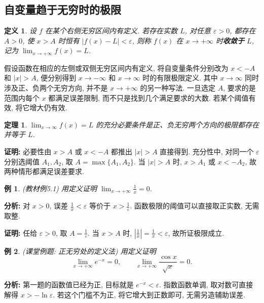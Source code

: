 \documentclass[UTF8,openany]{ctexbook}
\theoremstyle{chinesetextbook}
\newtheorem{definition}{定义}[section]
\newtheorem{example}{例}[section]
\newtheorem{theorem}{定理}[section]
\newenvironment{cnproof}{\par\indent\textbf{证明:} \ignorespaces}{\par}
\begin{document}
\subsection{自变量趋于无穷时的极限}
\begin{definition}
设 $f$ 在某个右侧无穷区间内有定义. 若存在实数 $L$, 对任意 $\varepsilon>0$, 都存在 $A>0$, 使 $x>A$ 时恒有 $|f(x)-L|<\varepsilon$, 则称 $f(x)$ 在 $x\to+\infty$ 时\textbf{收敛于} $L$, 记为 $\displaystyle \lim_{x\to+\infty}f(x)=L$.
\end{definition}
假设函数在相应的左侧或双侧无穷区间内有定义, 将自变量条件分别改为 $x<-A$ 和 $|x|>A$, 便分别得到 $x\to-\infty$ 和 $x\to\infty$ 时的有限极限定义. 其中 $x\to\infty$ 同时涉及正、负两个无穷方向, 并不是 $x\to+\infty$ 的另一种写法. 一旦选定 $A$, 要求的是范围内每个 $x$ 都满足误差限制, 而不只是找到几个满足要求的大数. 若某个阈值有效, 将它增大仍有效.
\begin{theorem}
$\displaystyle \lim_{x\to\infty}f(x)=L$ 的充分必要条件是正、负无穷两个方向的极限都存在并等于 $L$.
\end{theorem}
\begin{cnproof}
必要性由 $x>A$ 或 $x<-A$ 都推出 $|x|>A$ 直接得到. 充分性中, 对同一个 $\varepsilon$ 分别选阈值 $A_1,A_2$, 取 $A=\max\{A_1,A_2\}$. 当 $|x|>A$ 时, $x>A_1$ 或 $x<-A_2$, 故两种情形都满足误差要求.
\end{cnproof}
\begin{example}
(教材例5.1) 用定义证明 $\displaystyle \lim_{x\to+\infty}\frac1x=0$.
\end{example}
\par\indent\textbf{分析:} 对 $x>0$, 误差 $\displaystyle \frac1x<\varepsilon$ 等价于 $\displaystyle x>\frac1\varepsilon$. 函数极限的阈值可以直接取正实数, 无需取整.
\begin{cnproof}
任给 $\varepsilon>0$, 取 $\displaystyle A=\frac1\varepsilon$. 当 $x>A$ 时, $\displaystyle |\frac1x|=\frac1x<\varepsilon$, 故所证极限成立.
\end{cnproof}
\begin{example}
(课堂例题: 正无穷处的定义法) 用定义证明
\[
\lim_{x\to+\infty}e^{-x}=0,\qquad
\lim_{x\to+\infty}\frac{\cos x}{\sqrt x}=0.
\]
\end{example}
\par\indent\textbf{分析:} 第一题的函数值已经为正, 目标就是 $e^{-x}<\varepsilon$. 指数函数单调, 取对数可直接解得 $x>-\ln\varepsilon$. 若这个门槛不为正, 将它增大到正数即可, 无需另造辅助误差.
\end{document}
